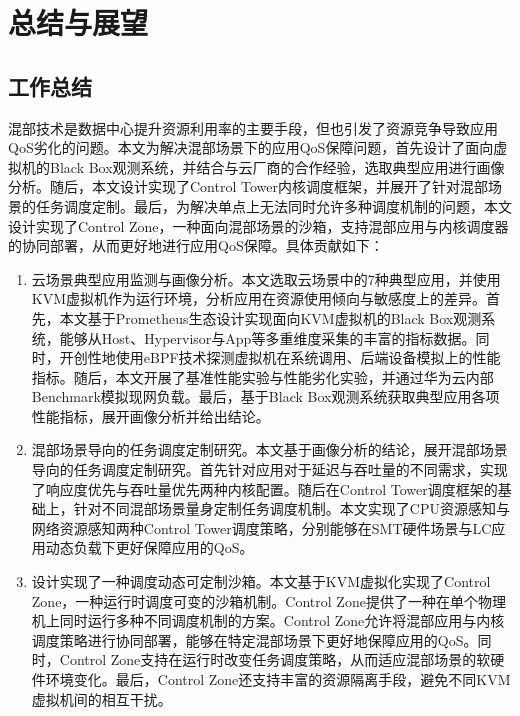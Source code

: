 \chapter{总结与展望}\label{chap:conclusion}

\section{工作总结}

混部技术是数据中心提升资源利用率的主要手段，但也引发了资源竞争导致应用QoS劣化的问题。本文为解决混部场景下的应用QoS保障问题，首先设计了面向虚拟机的Black Box观测系统，并结合与云厂商的合作经验，选取典型应用进行画像分析。随后，本文设计实现了Control Tower内核调度框架，并展开了针对混部场景的任务调度定制。最后，为解决单点上无法同时允许多种调度机制的问题，本文设计实现了Control Zone，一种面向混部场景的沙箱，支持混部应用与内核调度器的协同部署，从而更好地进行应用QoS保障。具体贡献如下：

\begin{enumerate}

    \item 云场景典型应用监测与画像分析。本文选取云场景中的7种典型应用，并使用KVM虚拟机作为运行环境，分析应用在资源使用倾向与敏感度上的差异。首先，本文基于Prometheus生态设计实现面向KVM虚拟机的Black Box观测系统，能够从Host、Hypervisor与App等多重维度采集的丰富的指标数据。同时，开创性地使用eBPF技术探测虚拟机在系统调用、后端设备模拟上的性能指标。随后，本文开展了基准性能实验与性能劣化实验，并通过华为云内部Benchmark模拟现网负载。最后，基于Black Box观测系统获取典型应用各项性能指标，展开画像分析并给出结论。

    \item 混部场景导向的任务调度定制研究。本文基于画像分析的结论，展开混部场景导向的任务调度定制研究。首先针对应用对于延迟与吞吐量的不同需求，实现了响应度优先与吞吐量优先两种内核配置。随后在Control Tower调度框架的基础上，针对不同混部场景量身定制任务调度机制。本文实现了CPU资源感知与网络资源感知两种Control Tower调度策略，分别能够在SMT硬件场景与LC应用动态负载下更好保障应用的QoS。

    \item 设计实现了一种调度动态可定制沙箱。本文基于KVM虚拟化实现了Control Zone，一种运行时调度可变的沙箱机制。Control Zone提供了一种在单个物理机上同时运行多种不同调度机制的方案。Control Zone允许将混部应用与内核调度策略进行协同部署，能够在特定混部场景下更好地保障应用的QoS。同时，Control Zone支持在运行时改变任务调度策略，从而适应混部场景的软硬件环境变化。最后，Control Zone还支持丰富的资源隔离手段，避免不同KVM虚拟机间的相互干扰。

\end{enumerate}


